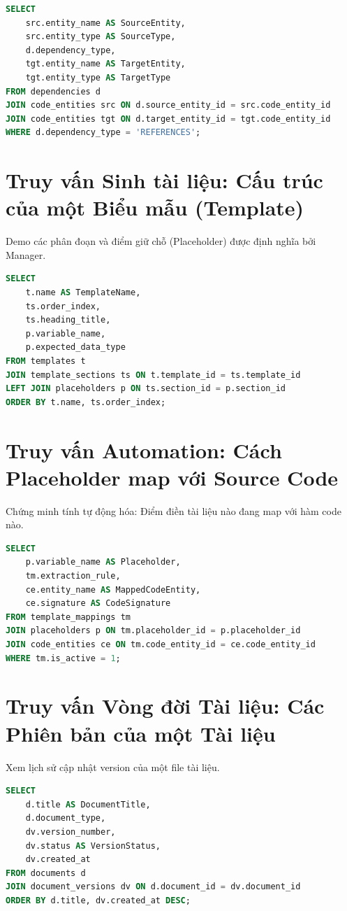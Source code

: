 \begin{lstlisting}[language=SQL]
SELECT 
    src.entity_name AS SourceEntity,
    src.entity_type AS SourceType,
    d.dependency_type,
    tgt.entity_name AS TargetEntity,
    tgt.entity_type AS TargetType
FROM dependencies d
JOIN code_entities src ON d.source_entity_id = src.code_entity_id
JOIN code_entities tgt ON d.target_entity_id = tgt.code_entity_id
WHERE d.dependency_type = 'REFERENCES';
\end{lstlisting}

\section{Truy vấn Sinh tài liệu: Cấu trúc của một Biểu mẫu (Template)}
Demo các phân đoạn và điểm giữ chỗ (Placeholder) được định nghĩa bởi Manager.

\begin{lstlisting}[language=SQL]
SELECT 
    t.name AS TemplateName,
    ts.order_index,
    ts.heading_title,
    p.variable_name,
    p.expected_data_type
FROM templates t
JOIN template_sections ts ON t.template_id = ts.template_id
LEFT JOIN placeholders p ON ts.section_id = p.section_id
ORDER BY t.name, ts.order_index;
\end{lstlisting}

\section{Truy vấn Automation: Cách Placeholder map với Source Code}
Chứng minh tính tự động hóa: Điểm điền tài liệu nào đang map với hàm code nào.

\begin{lstlisting}[language=SQL]
SELECT 
    p.variable_name AS Placeholder,
    tm.extraction_rule,
    ce.entity_name AS MappedCodeEntity,
    ce.signature AS CodeSignature
FROM template_mappings tm
JOIN placeholders p ON tm.placeholder_id = p.placeholder_id
JOIN code_entities ce ON tm.code_entity_id = ce.code_entity_id
WHERE tm.is_active = 1;
\end{lstlisting}

\section{Truy vấn Vòng đời Tài liệu: Các Phiên bản của một Tài liệu}
Xem lịch sử cập nhật version của một file tài liệu.

\begin{lstlisting}[language=SQL]
SELECT 
    d.title AS DocumentTitle,
    d.document_type,
    dv.version_number,
    dv.status AS VersionStatus,
    dv.created_at
FROM documents d
JOIN document_versions dv ON d.document_id = dv.document_id
ORDER BY d.title, dv.created_at DESC;
\end{lstlisting}

